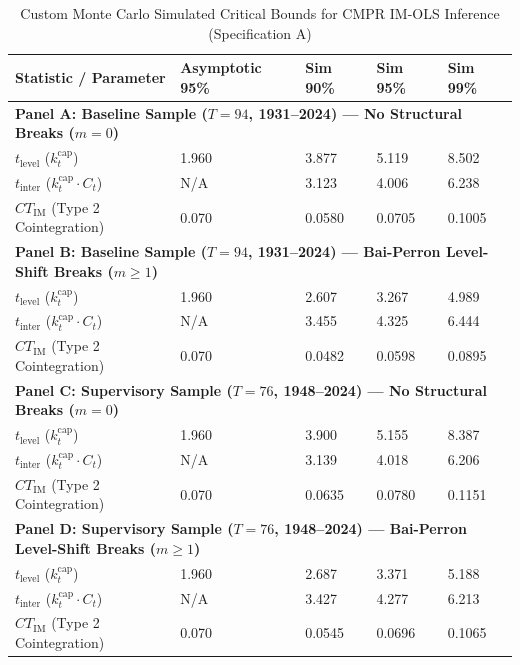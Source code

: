 \FloatBarrier
\begin{table}[H]
	\centering
	\caption{Custom Monte Carlo Simulated Critical Bounds for CMPR IM-OLS Inference (Specification A)}
	\label{tab:appendixD_specA_mc_bounds}
	\begin{tabular}{p{4.2cm} p{2.6cm} p{2.2cm} p{2.2cm} p{2.2cm}}
		\toprule
		\textbf{Statistic / Parameter} & \textbf{Asymptotic 95\%} & \textbf{Sim 90\%} & \textbf{Sim 95\%} & \textbf{Sim 99\%} \\
		\midrule
		\multicolumn{5}{l}{\textbf{Panel A: Baseline Sample ($T=94$, 1931--2024) --- No Structural Breaks ($m=0$)}} \\
		\midrule
		$t_{\text{level}}$ ($k_t^{\text{cap}}$) & 1.960 & 3.877 & 5.119 & 8.502 \\
		$t_{\text{inter}}$ ($k_t^{\text{cap}} \cdot C_t$) & N/A & 3.123 & 4.006 & 6.238 \\
		$CT_{\text{IM}}$ (Type 2 Cointegration) & 0.070 & 0.0580 & 0.0705 & 0.1005 \\
		\midrule
		\multicolumn{5}{l}{\textbf{Panel B: Baseline Sample ($T=94$, 1931--2024) --- Bai-Perron Level-Shift Breaks ($m \ge 1$)}} \\
		\midrule
		$t_{\text{level}}$ ($k_t^{\text{cap}}$) & 1.960 & 2.607 & 3.267 & 4.989 \\
		$t_{\text{inter}}$ ($k_t^{\text{cap}} \cdot C_t$) & N/A & 3.455 & 4.325 & 6.444 \\
		$CT_{\text{IM}}$ (Type 2 Cointegration) & 0.070 & 0.0482 & 0.0598 & 0.0895 \\
		\midrule
		\multicolumn{5}{l}{\textbf{Panel C: Supervisory Sample ($T=76$, 1948--2024) --- No Structural Breaks ($m=0$)}} \\
		\midrule
		$t_{\text{level}}$ ($k_t^{\text{cap}}$) & 1.960 & 3.900 & 5.155 & 8.387 \\
		$t_{\text{inter}}$ ($k_t^{\text{cap}} \cdot C_t$) & N/A & 3.139 & 4.018 & 6.206 \\
		$CT_{\text{IM}}$ (Type 2 Cointegration) & 0.070 & 0.0635 & 0.0780 & 0.1151 \\
		\midrule
		\multicolumn{5}{l}{\textbf{Panel D: Supervisory Sample ($T=76$, 1948--2024) --- Bai-Perron Level-Shift Breaks ($m \ge 1$)}} \\
		\midrule
		$t_{\text{level}}$ ($k_t^{\text{cap}}$) & 1.960 & 2.687 & 3.371 & 5.188 \\
		$t_{\text{inter}}$ ($k_t^{\text{cap}} \cdot C_t$) & N/A & 3.427 & 4.277 & 6.213 \\
		$CT_{\text{IM}}$ (Type 2 Cointegration) & 0.070 & 0.0545 & 0.0696 & 0.1065 \\

\end{tabular}
\end{table}
